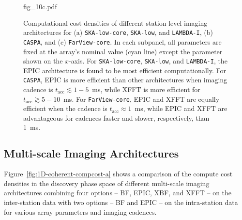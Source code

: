 \documentclass[
  journal=pasa,
  manuscript=article-type,
  year=2020,
  volume=37,
]{cup-journal}
\begin{document}
\begin{figure}
{%
{fig_10c.pdf}
}
\caption{Computational cost densities of different station level imaging architectures for (a) \texttt{SKA-low-core}, \texttt{SKA-low}, and \texttt{LAMBDA-I}, (b) \texttt{CASPA}, and (c) \texttt{FarView-core}. In each subpanel, all parameters are fixed at the array's nominal value (cyan line) except the parameter shown on the $x$-axis. For \texttt{SKA-low-core}, \texttt{SKA-low}, and \texttt{LAMBDA-I}, the EPIC architecture is found to be most efficient computationally. For \texttt{CASPA}, EPIC is more efficient than other architectures when imaging cadence is $t_\textrm{acc}\lesssim 1-5$~ms, while XFFT is more efficient for $t_\textrm{acc}\gtrsim 5-10$~ms. For \texttt{FarView-core}, EPIC and XFFT are equally efficient when the cadence is $t_\textrm{acc}\approx 1$~ms, while EPIC and XFFT are advantageous for cadences faster and slower, respectively, than 1~ms.  \label{fig:1D-incoherent-compcost}}
\end{figure}

\subsection{Multi-scale Imaging Architectures}\label{sec:multi-scale-imaging}

Figure~\ref{fig:1D-coherent-compcost-a} shows a comparison of the compute cost densities in the discovery phase space of different multi-scale imaging architectures combining four options -- BF, EPIC, XBF, and XFFT -- on the inter-station data with two options -- BF and EPIC -- on the intra-station data for various array parameters and imaging cadences.  
\end{document}
